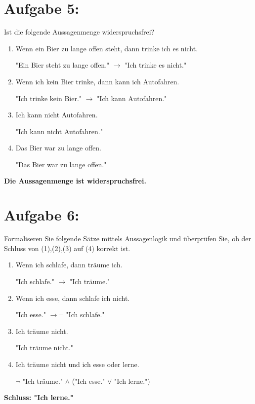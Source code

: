 \documentclass[12pt]{article}
\begin{document}
  \section*{Aufgabe 5:}
  Ist die folgende Aussagenmenge widerspruchsfrei?
  \begin{enumerate}
    \item Wenn ein Bier zu lange offen steht, dann trinke ich es nicht.\par
    "Ein Bier steht zu lange offen." \(\rightarrow\) "Ich trinke es nicht."

    \item Wenn ich kein Bier trinke, dann kann ich Autofahren.\par
    "Ich trinke kein Bier." \(\rightarrow\) "Ich kann Autofahren."

    \item Ich kann nicht Autofahren.\par
    "Ich kann nicht Autofahren."

    \item Das Bier war zu lange offen.\par
    "Das Bier war zu lange offen."

  \end{enumerate}

  \textbf{Die Aussagenmenge ist widerspruchsfrei.}

  \section*{Aufgabe 6:}
  Formaliseren Sie folgende Sätze mittels Aussagenlogik und überprüfen Sie, ob der Schluss von (1),(2),(3) auf (4) korrekt ist.
  \begin{enumerate}
    \item Wenn ich schlafe, dann träume ich.\par
    "Ich schlafe." \(\rightarrow\) "Ich träume."

    \item Wenn ich esse, dann schlafe ich nicht.\par
    "Ich esse." \(\rightarrow \neg\) "Ich schlafe."

    \item Ich träume nicht.\par
    "Ich träume nicht."

    \item Ich träume nicht und ich esse oder lerne.\par
    \(\neg\) "Ich träume." \(\wedge\) ("Ich esse." \(\vee\) "Ich lerne.")

  \end{enumerate}

  \textbf{Schluss: "Ich lerne."}
\end{document}
